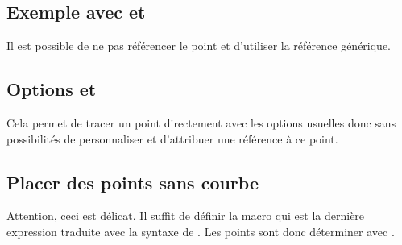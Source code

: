 \newpage
\subsection{Exemple avec  et }
Il est possible de ne pas référencer le point et d'utiliser la référence générique.

\begin{tkzexample}[latex=7cm,small]
\end{tkzexample}

\subsection{Options  et }
Cela permet de tracer un point directement avec les options usuelles donc sans possibilités de personnaliser et d'attribuer une référence à ce point.

\begin{tkzexample}[latex=7cm,small]
\end{tkzexample}

\newpage
\subsection{Placer des points sans courbe}
Attention, ceci est délicat. Il suffit de définir la macro  qui est la dernière expression traduite avec la syntaxe de . Les points sont donc déterminer avec .

\begin{tkzexample}[]
\end{tkzexample}

